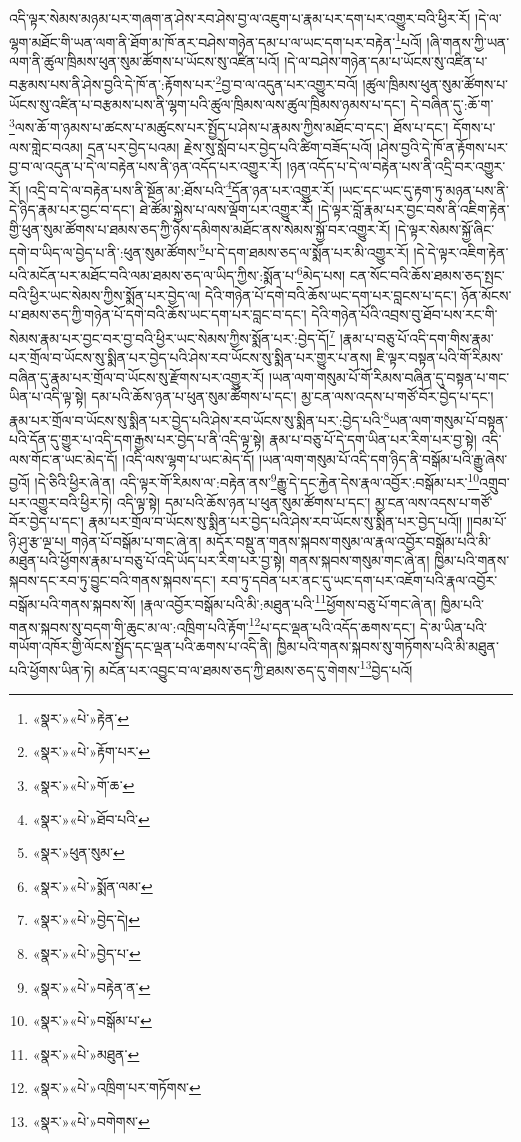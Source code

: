 འདི་ལྟར་སེམས་མཉམ་པར་གཞག་ན་ཤེས་རབ་ཤེས་བྱ་ལ་འཇུག་པ་རྣམ་པར་དག་པར་འགྱུར་བའི་ཕྱིར་རོ། །དེ་ལ་ལྷག་མཐོང་གི་ཡན་ལག་ནི་ཐོག་མ་ཁོ་ནར་བཤེས་གཉེན་དམ་པ་ལ་ཡང་དག་པར་བརྟེན་\footnote{«སྣར་»«པེ་»རྟེན་}པའོ། །ཞི་གནས་ཀྱི་ཡན་ལག་ནི་ཚུལ་ཁྲིམས་ཕུན་སུམ་ཚོགས་པ་ཡོངས་སུ་འཛིན་པའོ། །དེ་ལ་བཤེས་གཉེན་དམ་པ་ཡོངས་སུ་འཛིན་པ་བརྩམས་པས་ནི་ཤེས་བྱའི་དེ་ཁོ་ན་:རྟོགས་པར་\footnote{«སྣར་»«པེ་»རྟོག་པར་}བྱ་བ་ལ་འདུན་པར་འགྱུར་བའོ། །ཚུལ་ཁྲིམས་ཕུན་སུམ་ཚོགས་པ་ཡོངས་སུ་འཛིན་པ་བརྩམས་པས་ནི་ལྷག་པའི་ཚུལ་ཁྲིམས་ལས་ཚུལ་ཁྲིམས་ཉམས་པ་དང་། དེ་བཞིན་དུ་:ཆོ་ག་\footnote{«སྣར་»«པེ་»གོ་ཆ་}ལས་ཆོ་ག་ཉམས་པ་ཚངས་པ་མཚུངས་པར་སྤྱོད་པ་ཤེས་པ་རྣམས་ཀྱིས་མཐོང་བ་དང་། ཐོས་པ་དང་། དོགས་པ་ལས་གླེང་བའམ། དྲན་པར་བྱེད་པའམ། རྗེས་སུ་སློབ་པར་བྱེད་པའི་ཚིག་བཟོད་པའོ། །ཤེས་བྱའི་དེ་ཁོ་ན་རྟོགས་པར་བྱ་བ་ལ་འདུན་པ་དེ་ལ་བརྟེན་པས་ནི་ཉན་འདོད་པར་འགྱུར་རོ། །ཉན་འདོད་པ་དེ་ལ་བརྟེན་པས་ནི་འདྲི་བར་འགྱུར་རོ། །འདྲི་བ་དེ་ལ་བརྟེན་པས་ནི་སྔོན་མ་:ཐོས་པའི་\footnote{«སྣར་»«པེ་»ཐོབ་པའི་}དོན་ཉན་པར་འགྱུར་རོ། །ཡང་དང་ཡང་དུ་རྟག་ཏུ་མཉན་པས་ནི་དེ་ཉིད་རྣམ་པར་བྱང་བ་དང་། ཐེ་ཚོམ་སྐྱེས་པ་ལས་ལྡོག་པར་འགྱུར་རོ། །དེ་ལྟར་བློ་རྣམ་པར་བྱང་བས་ནི་འཇིག་རྟེན་གྱི་ཕུན་སུམ་ཚོགས་པ་ཐམས་ཅད་ཀྱི་ཉེས་དམིགས་མཐོང་ནས་སེམས་སྐྱོ་བར་འགྱུར་རོ། །དེ་ལྟར་སེམས་སྐྱོ་ཞིང་དགེ་བ་ཡིད་ལ་བྱེད་པ་ནི་:ཕུན་སུམ་ཚོགས་\footnote{«སྣར་»ཕུན་སུམ་}པ་དེ་དག་ཐམས་ཅད་ལ་སྨོན་པར་མི་འགྱུར་རོ། །དེ་དེ་ལྟར་འཇིག་རྟེན་པའི་མངོན་པར་མཐོང་བའི་ལམ་ཐམས་ཅད་ལ་ཡིད་ཀྱིས་:སྨོན་པ་\footnote{«སྣར་»«པེ་»སྨོན་ལམ་}མེད་པས། ངན་སོང་བའི་ཆོས་ཐམས་ཅད་སྤང་བའི་ཕྱིར་ཡང་སེམས་ཀྱིས་སྨོན་པར་བྱེད་ལ། དེའི་གཉེན་པོ་དགེ་བའི་ཆོས་ཡང་དག་པར་བླངས་པ་དང་། ཉོན་མོངས་པ་ཐམས་ཅད་ཀྱི་གཉེན་པོ་དགེ་བའི་ཆོས་ཡང་དག་པར་བླང་བ་དང་། དེའི་གཉེན་པོའི་འབྲས་བུ་ཐོབ་པས་རང་གི་སེམས་རྣམ་པར་བྱང་བར་བྱ་བའི་ཕྱིར་ཡང་སེམས་ཀྱིས་སྨོན་པར་:བྱེད་དོ།\footnote{«སྣར་»«པེ་»བྱེད་དེ།} །རྣམ་པ་བཅུ་པོ་འདི་དག་གིས་རྣམ་པར་གྲོལ་བ་ཡོངས་སུ་སྨིན་པར་བྱེད་པའི་ཤེས་རབ་ཡོངས་སུ་སྨིན་པར་གྱུར་པ་ནས། ཇི་ལྟར་བསྟན་པའི་གོ་རིམས་བཞིན་དུ་རྣམ་པར་གྲོལ་བ་ཡོངས་སུ་རྫོགས་པར་འགྱུར་རོ། །ཡན་ལག་གསུམ་པོ་གོ་རིམས་བཞིན་དུ་བསྟན་པ་གང་ཡིན་པ་འདི་ལྟ་སྟེ། དམ་པའི་ཆོས་ཉན་པ་ཕུན་སུམ་ཚོགས་པ་དང་། མྱ་ངན་ལས་འདས་པ་གཙོ་བོར་བྱེད་པ་དང་། རྣམ་པར་གྲོལ་བ་ཡོངས་སུ་སྨིན་པར་བྱེད་པའི་ཤེས་རབ་ཡོངས་སུ་སྨིན་པར་:བྱེད་པའི་\footnote{«སྣར་»«པེ་»བྱེད་པ་}ཡན་ལག་གསུམ་པོ་བསྟན་པའི་དོན་དུ་གྱུར་པ་འདི་དག་རྒྱས་པར་བྱེད་པ་ནི་འདི་ལྟ་སྟེ། རྣམ་པ་བཅུ་པོ་དེ་དག་ཡིན་པར་རིག་པར་བྱ་སྟེ། འདི་ལས་གོང་ན་ཡང་མེད་དོ། །འདི་ལས་ལྷག་པ་ཡང་མེད་དོ། །ཡན་ལག་གསུམ་པོ་འདི་དག་ཉིད་ནི་བསྒོམ་པའི་རྒྱུ་ཞེས་བྱའོ། །དེ་ཅིའི་ཕྱིར་ཞེ་ན། འདི་ལྟར་གོ་རིམས་ལ་:བརྟེན་ནས་\footnote{«སྣར་»«པེ་»བརྟེན་ན་}རྒྱུ་དེ་དང་རྐྱེན་དེས་རྣལ་འབྱོར་:བསྒོམ་པར་\footnote{«སྣར་»«པེ་»བསྒོམ་པ་}འགྲུབ་པར་འགྱུར་བའི་ཕྱིར་ཏེ། འདི་ལྟ་སྟེ། དམ་པའི་ཆོས་ཉན་པ་ཕུན་སུམ་ཚོགས་པ་དང་། མྱ་ངན་ལས་འདས་པ་གཙོ་བོར་བྱེད་པ་དང་། རྣམ་པར་གྲོལ་བ་ཡོངས་སུ་སྨིན་པར་བྱེད་པའི་ཤེས་རབ་ཡོངས་སུ་སྨིན་པར་བྱེད་པའོ།། །།བམ་པོ་ཉི་ཤུ་རྩ་ལྔ་པ། གཉེན་པོ་བསྒོམ་པ་གང་ཞེ་ན། མདོར་བསྡུ་ན་གནས་སྐབས་གསུམ་ལ་རྣལ་འབྱོར་བསྒོམ་པའི་མི་མཐུན་པའི་ཕྱོགས་རྣམ་པ་བཅུ་པོ་འདི་ཡོད་པར་རིག་པར་བྱ་སྟེ། གནས་སྐབས་གསུམ་གང་ཞེ་ན། ཁྱིམ་པའི་གནས་སྐབས་དང་རབ་ཏུ་བྱུང་བའི་གནས་སྐབས་དང་། རབ་ཏུ་དབེན་པར་ནང་དུ་ཡང་དག་པར་འཇོག་པའི་རྣལ་འབྱོར་བསྒོམ་པའི་གནས་སྐབས་སོ། །རྣལ་འབྱོར་བསྒོམ་པའི་མི་:མཐུན་པའི་\footnote{«སྣར་»«པེ་»མཐུན་}ཕྱོགས་བཅུ་པོ་གང་ཞེ་ན། ཁྱིམ་པའི་གནས་སྐབས་སུ་བདག་གི་ཆུང་མ་ལ་:འཁྲིག་པའི་རྟོག་\footnote{«སྣར་»«པེ་»འཁྲིག་པར་གཏོགས་}པ་དང་ལྡན་པའི་འདོད་ཆགས་དང་། དེ་མ་ཡིན་པའི་གཡོག་འཁོར་གྱི་ལོངས་སྤྱོད་དང་ལྡན་པའི་ཆགས་པ་འདི་ནི། ཁྱིམ་པའི་གནས་སྐབས་སུ་གཏོགས་པའི་མི་མཐུན་པའི་ཕྱོགས་ཡིན་ཏེ། མངོན་པར་འབྱུང་བ་ལ་ཐམས་ཅད་ཀྱི་ཐམས་ཅད་དུ་གེགས་\footnote{«སྣར་»«པེ་»བགེགས་}བྱེད་པའོ། 